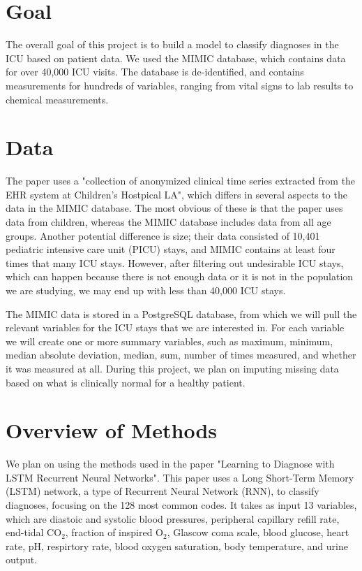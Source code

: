 \documentclass[12pt]{article}
\begin{document}

\vspace{10pt}

\section{Goal}
The overall goal of this project is to build a model to classify diagnoses in the ICU based on patient data. We used the MIMIC database, which contains data for over 40,000 ICU visits. The database is de-identified, and contains measurements for hundreds of variables, ranging from vital signs to lab results to chemical measurements.

\section{Data}
The paper uses a "collection of anonymized clinical time series extracted from the EHR system at Children's Hostpical LA", which differs in several aspects to the data in the MIMIC database. The most obvious of these is that the paper uses data from children, whereas the MIMIC database includes data from all age groups. Another potential difference is size; their data consisted of 10,401 pediatric intensive care unit (PICU) stays, and MIMIC contains at least four times that many ICU stays. However, after filtering out undesirable ICU stays, which can happen because there is not enough data or it is not in the population we are studying, we may end up with less than 40,000 ICU stays.

The MIMIC data is stored in a PostgreSQL database, from which we will pull the relevant variables for the ICU stays that we are interested in. For each variable we will create one or more summary variables, such as  maximum, minimum, median absolute deviation, median, sum, number of times measured, and whether it was measured at all. During this project, we plan on imputing missing data based on what is clinically normal for a healthy patient.

\section{Overview of Methods}
We plan on using the methods used in the paper "Learning to Diagnose with LSTM Recurrent Neural Networks". This paper uses a Long Short-Term Memory (LSTM) network, a type of Recurrent Neural Network (RNN), to classify diagnoses, focusing on the 128 most common codes. It takes as input 13 variables, which are diastoic and systolic blood pressures, peripheral capillary refill rate, end-tidal CO$_2$, fraction of inspired O$_2$, Glascow coma scale, blood glucose, heart rate, pH, respirtory rate, blood oxygen saturation, body temperature, and urine output.
\end{document}
